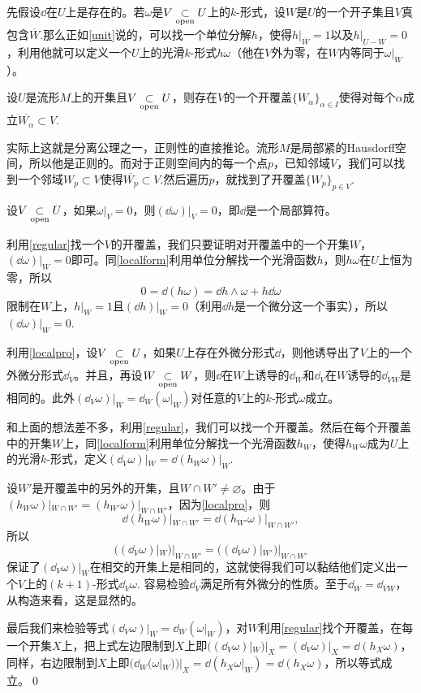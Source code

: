 \para \label{localform}先假设$\dd$在$U$上是存在的。若$\omega$是$V\underset{\mathrm{open}}{\subset} U$上的$k$-形式，设$W$是$U$的一个开子集且$V$真包含$\overline{W}$.那么正如\eqref{unit}说的，可以找一个单位分解$h$，使得$h|_{\overline{W}}=1$以及$h|_{U-W}=0$，利用他就可以定义一个$U$上的光滑$k$-形式$h\omega$（他在$V$外为零，在$W$内等同于$\omega|_W$）。

\para \label{regular}设$U$是流形$M$上的开集且$V\underset{\mathrm{open}}{\subset} U$，则存在$V$的一个开覆盖$\{W_\alpha\}_{\alpha\in I}$使得对每个$\alpha$成立$\overline{W_\alpha}\subset V$.

实际上这就是分离公理之一，正则性的直接推论。流形$M$是局部紧的Hausdorff空间，所以他是正则的。而对于正则空间内的每一个点$p$，已知邻域$V$，我们可以找到一个邻域$W_p\subset V$使得$\overline{W_p}\subset V$.然后遍历$p$，就找到了开覆盖$\{W_p\}_{p\in V}$.

\para \label{localpro}设$V\underset{\mathrm{open}}{\subset} U$，如果$\omega|_V=0$，则$(\dd \omega)|_V=0$，即$\dd$是一个局部算符。

利用\eqref{regular}找一个$V$的开覆盖，我们只要证明对开覆盖中的一个开集$W$，$(\dd \omega)|_{W}=0$即可。同\eqref{localform}利用单位分解找一个光滑函数$h$，则$h\omega$在$U$上恒为零，所以
\[
	0=\dd (h\omega)=\dd h \wedge \omega +h\dd \omega
\]
限制在$W$上，$h|_{W}=1$且$(\dd h)|_{W}=0$（利用$\dd h$是一个微分这一个事实），所以$(\dd \omega)|_{W}=0$.

\pro \label{localdef}利用\eqref{localpro}，设$V\underset{\mathrm{open}}{\subset} U$，如果$U$上存在外微分形式$\dd$，则他诱导出了$V$上的一个外微分形式$\dd_V$。并且，再设$W\underset{\mathrm{open}}{\subset} W$，则$\dd$在$W$上诱导的$\dd_W$和$\dd_V$在$W$诱导的$\dd_{VW}$是相同的。此外$(\dd_V \omega)|_W=\dd_W (\omega|_W)$对任意的$V$上的$k$-形式$\omega$成立。

\proof 和上面的想法差不多，利用\eqref{regular}，我们可以找一个开覆盖。然后在每个开覆盖中的开集$W$上，同\eqref{localform}利用单位分解找一个光滑函数$h_W$，使得$h_W\omega$成为$U$上的光滑$k$-形式，定义$(\dd_V \omega)|_{W}=\dd (h_W\omega)|_{W}$.

设$W'$是开覆盖中的另外的开集，且$W\cap W'\neq \varnothing$。由于$(h_W\omega)|_{W\cap W'}=(h_{W'}\omega)|_{W\cap W'}$，因为\eqref{localpro}，则
\[
	\dd (h_W\omega)|_{W\cap W'}=\dd (h_{W'}\omega)|_{W\cap W'},
\]
所以
\[
	((\dd_V \omega)|_{W})|_{W\cap W'}=((\dd_V \omega)|_{W'})|_{W\cap W'}
\]
保证了$(\dd_V \omega)|_W$在相交的开集上是相同的，这就使得我们可以黏结他们定义出一个$V$上的$(k+1)$-形式$\dd_V \omega$. 容易检验$\dd_V$满足所有外微分的性质。至于$\dd_W=\dd_{VW}$，从构造来看，这是显然的。

最后我们来检验等式$(\dd_V \omega)|_W=\dd_W (\omega|_W)$，对$W$利用\eqref{regular}找个开覆盖，在每一个开集$X$上，把上式左边限制到$X$上即$((\dd_V \omega)|_W)|_X=(\dd_V \omega)|_X=\dd(h_X\omega)$，同样，右边限制到$X$上即$(\dd_W (\omega|_W))|_X=\dd(h_X\omega|_W)=\dd(h_X\omega)$，所以等式成立。\qed

